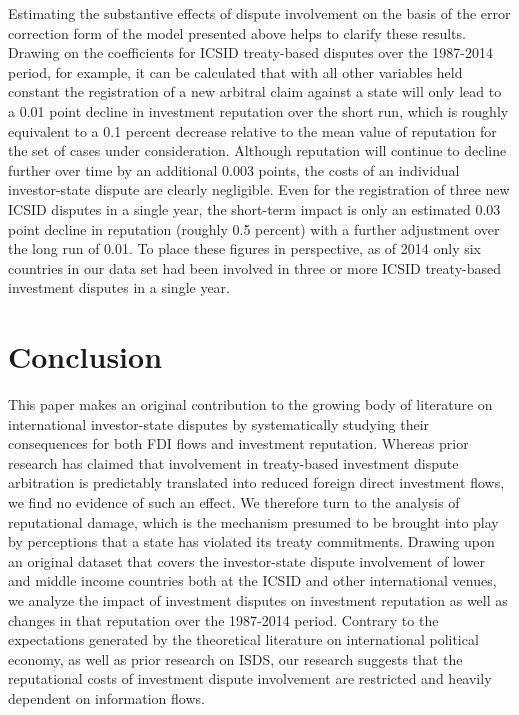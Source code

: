 \documentclass[12pt,onesided]{amsart}
\begin{document}

Estimating the substantive effects of dispute involvement on the basis of the error correction form of the model presented above helps to clarify these results. Drawing on the coefficients for ICSID treaty-based disputes over the 1987-2014 period, for example, it can be calculated that with all other variables held constant the registration of a new arbitral claim against a state will only lead to a 0.01 point decline in investment reputation over the short run, which is roughly equivalent to a 0.1 percent decrease relative to the mean value of reputation for the set of cases under consideration. Although reputation will continue to decline further over time by an additional 0.003 points, the costs of an individual investor-state dispute are clearly negligible. Even for the registration of three new ICSID disputes in a single year, the short-term impact is only an estimated 0.03 point decline in reputation (roughly 0.5 percent) with a further adjustment over the long run of 0.01. To place these figures in perspective, as of 2014 only six countries in our data set had been involved in three or more ICSID treaty-based investment disputes in a single year. 

\section*{Conclusion}

This paper makes an original contribution to the growing body of literature on international investor-state disputes by systematically studying their consequences for both FDI flows and investment reputation. Whereas prior research has claimed that involvement in treaty-based investment dispute arbitration is predictably translated into reduced foreign direct investment flows, we find no evidence of such an effect. We therefore turn to the analysis of reputational damage, which is the mechanism presumed to be brought into play by perceptions that a state has violated its treaty commitments. Drawing upon an original dataset that covers the investor-state dispute involvement of lower and middle income countries both at the ICSID and other international venues, we analyze the impact of investment disputes on investment reputation as well as changes in that reputation over the 1987-2014 period. Contrary to the expectations generated by the theoretical literature on international political economy, as well as prior research on ISDS, our research suggests that the reputational costs of investment dispute involvement are restricted and heavily dependent on information flows. 
\end{document}
